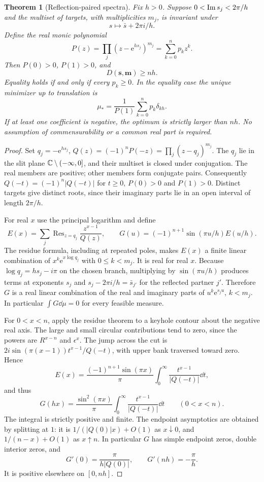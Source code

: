 \documentclass[11pt]{article}
\newtheorem{theorem}{Theorem}[section]
\theoremstyle{remark}\newtheorem{remark}[theorem]{Remark}
\newcommand{\e}{\mathrm e}\newcommand{\norm}[1]{\left\|#1\right\|}
\begin{document}
\begin{theorem}[Reflection-paired spectra]\label{thm:base}
Fix $h>0$. Suppose $0<\operatorname{Im} s_j<2\pi/h$ and the multiset of targets, with multiplicities $m_j$, is invariant under
\[
 s\longmapsto \bar s+2\pi i/h.
\]
Define the real monic polynomial
\[
 P(z)=\prod_j(z-\e^{hs_j})^{m_j}=\sum_{k=0}^n p_k z^k.
\]
Then $P(0)>0$, $P(1)>0$, and
\[
 \boxed{D(\boldsymbol{s},\boldsymbol{m})\ge nh.}
\]
Equality holds if and only if every $p_k\ge0$. In the equality case the unique minimizer up to translation is
\[
 \boxed{\displaystyle \mu_*=\frac{1}{P(1)}\sum_{k=0}^n p_k\delta_{kh}.}
\]
If at least one coefficient is negative, the optimum is strictly larger than $nh$. No assumption of commensurability or a common real part is required.
\end{theorem}
\begin{proof}
Set $q_j=-\e^{hs_j}$, $Q(z)=(-1)^nP(-z)=\prod_j(z-q_j)^{m_j}$. The $q_j$ lie in the slit plane $\mathbb C\setminus(-\infty,0]$, and their multiset is closed under conjugation. The real members are positive; other members form conjugate pairs. Consequently $Q(-t)=(-1)^n|Q(-t)|$ for $t\ge0$, $P(0)>0$ and $P(1)>0$. Distinct targets give distinct roots, since their imaginary parts lie in an open interval of length $2\pi/h$.

For real $x$ use the principal logarithm and define
\[
 E(x)=\sum_j\operatorname{Res}_{z=q_j}\frac{z^{x-1}}{Q(z)},\qquad
 G(u)=(-1)^{n+1}\sin(\pi u/h)E(u/h).
\]
The residue formula, including at repeated poles, makes $E(x)$ a finite linear combination of $x^k\e^{x\log q_j}$ with $0\le k<m_j$. It is real for real $x$. Because $\log q_j=hs_j-i\pi$ on the chosen branch, multiplying by $\sin(\pi u/h)$ produces terms at exponents $s_j$ and $s_j-2\pi i/h=\bar s_{j'}$ for the reflected partner $j'$. Therefore $G$ is a real linear combination of the real and imaginary parts of $u^k\e^{s_j u}$, $k<m_j$. In particular $\int G\dd\mu=0$ for every feasible measure.

For $0<x<n$, apply the residue theorem to a keyhole contour about the negative real axis. The large and small circular contributions tend to zero, since the powers are $R^{x-n}$ and $\epsilon^x$. The jump across the cut is $2i\sin(\pi(x-1))t^{x-1}/Q(-t)$, with upper bank traversed toward zero. Hence
\[
 E(x)=\frac{(-1)^{n+1}\sin(\pi x)}{\pi}
       \int_0^\infty\frac{t^{x-1}}{|Q(-t)|}\dd t,
\]
and thus
\begin{equation}\label{eq:certificate}
 G(hx)=\frac{\sin^2(\pi x)}{\pi}
       \int_0^\infty\frac{t^{x-1}}{|Q(-t)|}\dd t\qquad(0<x<n).
\end{equation}
The integral is strictly positive and finite. The endpoint asymptotics are obtained by splitting at $1$: it is $1/(|Q(0)|x)+O(1)$ as $x\downarrow0$, and $1/(n-x)+O(1)$ as $x\uparrow n$. In particular $G$ has simple endpoint zeros, double interior zeros, and
\begin{equation}\label{eq:slopes}
 G'(0)=\frac{\pi}{h|Q(0)|},\qquad G'(nh)=-\frac{\pi}{h}.
\end{equation}
It is positive elsewhere on $[0,nh]$.


\end{proof}
\end{document}
